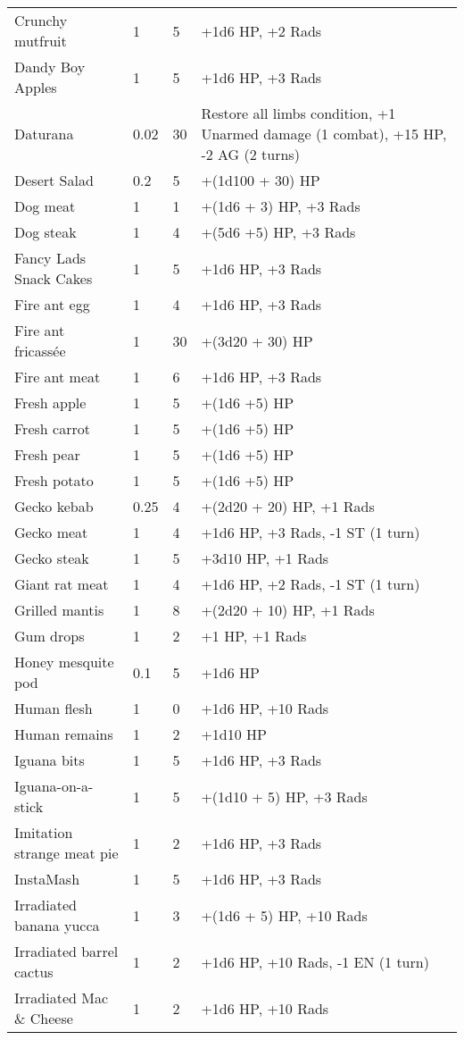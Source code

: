 \begin{longtable}{|p{4cm}|p{1.5cm}|p{1.5cm}|p{9cm}|}
Crunchy mutfruit & 1 & 5 & +1d6 HP, +2 Rads \\
Dandy Boy Apples & 1 & 5 & +1d6 HP, +3 Rads \\
Daturana & 0.02 & 30 & Restore all limbs condition, +1 Unarmed damage (1 combat), +15 HP, -2 AG (2 turns) \\
Desert Salad & 0.2 & 5 & +(1d100 + 30) HP \\
Dog meat & 1 & 1 & +(1d6 + 3) HP, +3 Rads \\
Dog steak & 1 & 4 & +(5d6 +5) HP, +3 Rads \\
Fancy Lads Snack Cakes & 1 & 5 & +1d6 HP, +3 Rads \\
Fire ant egg & 1 & 4 & +1d6 HP, +3 Rads \\
Fire ant fricassée & 1 & 30 & +(3d20 + 30) HP \\
Fire ant meat & 1 & 6 & +1d6 HP, +3 Rads \\
Fresh apple & 1 & 5 & +(1d6 +5) HP \\
Fresh carrot & 1 & 5 & +(1d6 +5) HP \\
Fresh pear & 1 & 5 & +(1d6 +5) HP \\
Fresh potato & 1 & 5 & +(1d6 +5) HP \\
Gecko kebab & 0.25 & 4 & +(2d20 + 20) HP, +1 Rads \\
Gecko meat & 1 & 4 & +1d6 HP, +3 Rads, -1 ST (1 turn) \\
Gecko steak & 1 & 5 & +3d10 HP, +1 Rads \\
Giant rat meat & 1 & 4 & +1d6 HP, +2 Rads, -1 ST (1 turn) \\
Grilled mantis & 1 & 8 & +(2d20 + 10) HP, +1 Rads \\
Gum drops & 1 & 2 & +1 HP, +1 Rads \\
Honey mesquite pod & 0.1 & 5 & +1d6 HP \\
Human flesh & 1 & 0 & +1d6 HP, +10 Rads \\
Human remains & 1 & 2 & +1d10 HP \\
Iguana bits & 1 & 5 & +1d6 HP, +3 Rads \\
Iguana-on-a-stick & 1 & 5 & +(1d10 + 5) HP, +3 Rads \\
Imitation strange meat pie & 1 & 2 & +1d6 HP, +3 Rads \\
InstaMash & 1 & 5 & +1d6 HP, +3 Rads \\
Irradiated banana yucca & 1 & 3 & +(1d6 + 5) HP, +10 Rads \\
Irradiated barrel cactus & 1 & 2 & +1d6 HP, +10 Rads, -1 EN (1 turn) \\
Irradiated Mac \& Cheese & 1 & 2 & +1d6 HP, +10 Rads \\

\end{longtable}
